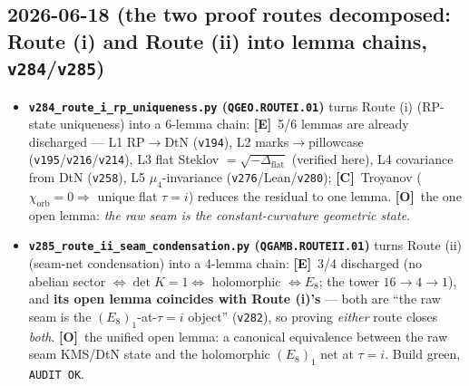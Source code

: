 \documentclass[11pt]{article}
\providecommand{\mE}{\textbf{[E]}}\providecommand{\mC}{\textbf{[C]}}
\providecommand{\mO}{\textbf{[O]}}\providecommand{\mX}{\textbf{[X]}}
\providecommand{\vref}[1]{\texttt{#1}}
\begin{document}
\subsection*{2026-06-18 (the two proof routes decomposed: Route (i) and Route (ii) into lemma chains, \texttt{v284}/\texttt{v285})}
\begin{itemize}
\item \textbf{\texttt{v284\_route\_i\_rp\_uniqueness.py} (\texttt{QGEO.ROUTEI.01})} turns Route (i) (RP-state
  uniqueness) into a 6-lemma chain: \mE\ 5/6 lemmas are already discharged --- L1 RP$\to$DtN (\vref{v194}),
  L2 marks$\to$pillowcase (\vref{v195}/\vref{v216}/\vref{v214}), L3 flat Steklov $=\sqrt{-\Delta_{\mathrm{flat}}}$
  (verified here), L4 covariance from DtN (\vref{v258}), L5 $\mu_4$-invariance (\vref{v276}/Lean/\vref{v280}); \mC\
  Troyanov ($\chi_{\mathrm{orb}}{=}0\Rightarrow$ unique flat $\tau{=}i$) reduces the residual to one lemma. \mO\
  the one open lemma: \emph{the raw seam is the constant-curvature geometric state}.
\item \textbf{\texttt{v285\_route\_ii\_seam\_condensation.py} (\texttt{QGAMB.ROUTEII.01})} turns Route (ii)
  (seam-net condensation) into a 4-lemma chain: \mE\ 3/4 discharged (no abelian sector $\Leftrightarrow\det K{=}1
  \Leftrightarrow$ holomorphic $\Leftrightarrow E_8$; the tower $16{\to}4{\to}1$), and \textbf{its open lemma
  coincides with Route (i)'s} --- both are ``the raw seam is the $(E_8)_1$-at-$\tau{=}i$ object'' (\vref{v282}),
  so proving \emph{either} route closes \emph{both}. \mO\ the unified open lemma: a canonical equivalence
  between the raw seam KMS/DtN state and the holomorphic $(E_8)_1$ net at $\tau{=}i$. Build green, \texttt{AUDIT OK}.
\end{itemize}
\end{document}
